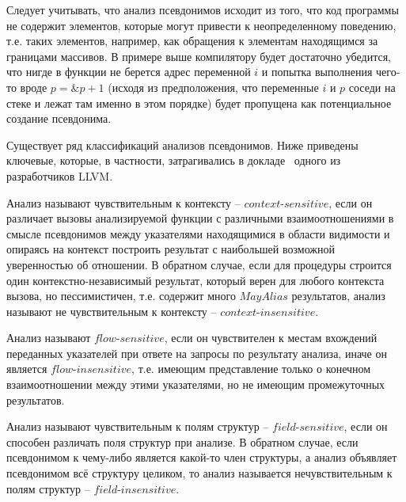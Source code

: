 \begin{myremark}
Следует учитывать, что анализ псевдонимов исходит из того, что код программы не содержит элементов, которые могут привести к неопределенному поведению, т.е. таких элементов, например, как обращения к элементам находящимся за границами массивов. В примере выше компилятору будет достаточно убедится, что нигде в функции не берется адрес переменной $i$ и попытка выполнения чего-то вроде $p = \&p + 1$ (исходя из предположения, что переменные $i$ и $p$ соседи на стеке и лежат там именно в этом порядке) будет пропущена как потенциальное создание псевдонима.
\end{myremark}


Существует ряд классификаций анализов псевдонимов. Ниже приведены ключевые, которые, в частности, затрагивались в докладе~\autocite{GohmanAAinLLVM} одного из разработчиков LLVM.

\begin{mydefinition}
Анализ называют чувствительным к контексту -- $context$-$sensitive$, если он различает вызовы анализируемой функции с различными взаимоотношениями в смысле псевдонимов между указателями находящимися в области видимости и опираясь на контекст построить результат с наибольшей возможной уверенностью об отношении. В обратном случае, если для процедуры строится один контекстно-независимый результат, который верен для любого контекста вызова, но пессимистичен, т.е. содержит много $MayAlias$ результатов, анализ называют не чувствительным к контексту -- $context$-$insensitive$.
\end{mydefinition}

\begin{mydefinition}
Анализ называют $flow$-$sensitive$, если он чувствителен к местам вхождений переданных указателей при ответе на запросы по результату анализа, иначе он является $flow$-$insensitive$, т.е. имеющим представление только о конечном взаимоотношении между этими указателями, но не имеющим промежуточных результатов.
\end{mydefinition}

\begin{mydefinition}
Анализ называют чувствительным к полям структур -- $field$-$sensitive$, если он способен различать поля структур при анализе. В обратном случае, если псевдонимом к чему-либо является какой-то член структуры, а анализ объявляет псевдонимом всё структуру целиком, то анализ называется нечувствительным к полям структур -- $field$-$insensitive$.
\end{mydefinition}

